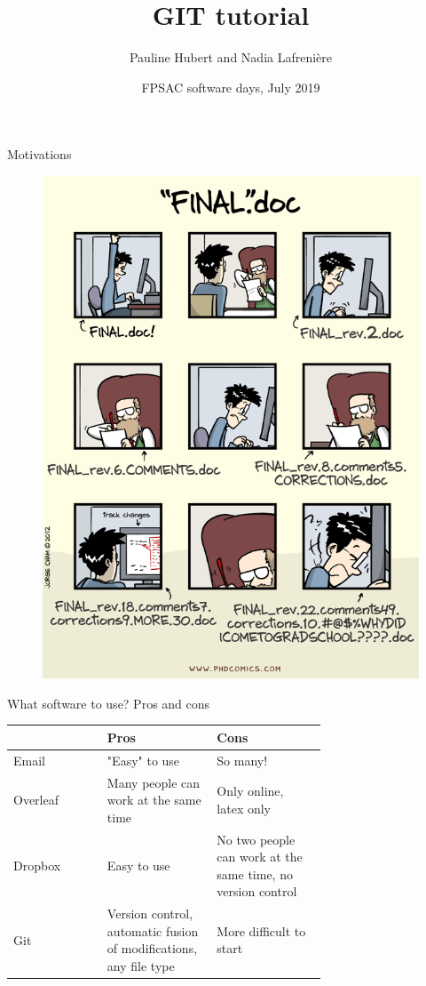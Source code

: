\documentclass{beamer}
\title{GIT tutorial}
\author{Pauline Hubert and Nadia Lafrenière}
\date{FPSAC software days, July 2019}
\begin{document}
	\maketitle
	\begin{frame}{Motivations}
		\begin{figure}[h]
			\centering
			\includegraphics[scale=.28]{phd101212s.png}
		\end{figure}
	\end{frame}

	\begin{frame}{What software to use? Pros and cons}
		\begin{tabular}{lp{0.35\linewidth}p{0.35\linewidth}}
			& Pros & Cons\\
			\hline
			Email & "Easy" to use & So many!\\
			\hline
			Overleaf & Many people can work at the same time & Only online, latex only\\
			\hline
			Dropbox & Easy to use & No two people can work at the same time, no version control\\
			\hline
			Git & Version control, automatic fusion of modifications, any file type & More difficult to start\\
		\end{tabular}
	\end{frame}
\end{document}
